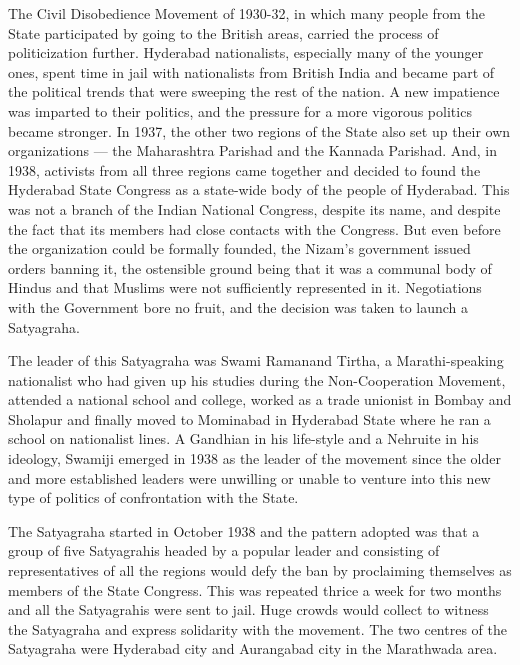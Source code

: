 The Civil Disobedience Movement of 1930-32, in which many people from the State participated by going to the British areas, carried the process of politicization further. Hyderabad nationalists, especially many of the younger ones, spent time in jail with nationalists from British India and became part of the political trends that were sweeping the rest of the nation. A new impatience was imparted to their politics, and the pressure for a more vigorous politics became stronger. In 1937, the other two regions of the State also set up their own organizations — the Maharashtra Parishad and the Kannada Parishad. And, in 1938, activists from all three regions came together and decided to found the Hyderabad State Congress as a state-wide body of the people of Hyderabad. This was not a branch of the Indian National Congress, despite its name, and despite the fact that its members had close contacts with the Congress. But even before the organization could be formally founded, the Nizam's government issued orders banning it, the ostensible ground being that it was a communal body of Hindus and that Muslims were not sufficiently represented in it. Negotiations with the Government bore no fruit, and the decision was taken to launch a Satyagraha. 

The leader of this Satyagraha was Swami Ramanand Tirtha, a Marathi-speaking nationalist who had given up his studies during the Non-Cooperation Movement, attended a national school and college, worked as a trade unionist in Bombay and Sholapur and finally moved to Mominabad in Hyderabad State where he ran a school on nationalist lines. A Gandhian in his life-style and a Nehruite in his ideology, Swamiji emerged in 1938 as the leader of the movement since the older and more established leaders were unwilling or unable to venture into this new type of politics of confrontation with the State. 

The Satyagraha started in October 1938 and the pattern adopted was that a group of five Satyagrahis headed by a popular leader and consisting of representatives of all the regions would defy the ban by proclaiming themselves as members of the State Congress. This was repeated thrice a week for two months and all the Satyagrahis were sent to jail. Huge crowds would collect to witness the Satyagraha and express solidarity with the movement. The two centres of the Satyagraha were Hyderabad city and Aurangabad city in the Marathwada area. 

